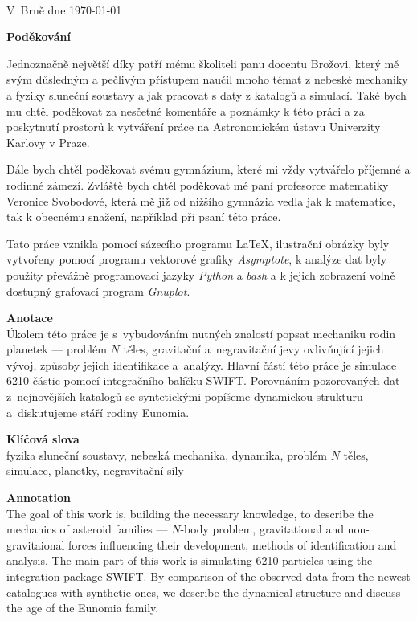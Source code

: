 \documentclass[A4paper, 12pt, oneside]{book}
\begin{document}
\

V~Brně dne \today\ \dotfill \hspace{10mm}

\newpage

{\large \bfseries Poděkování}

Jednoznačně největší díky patří mému školiteli panu docentu Brožovi, který mě svým důsledným a pečlivým přístupem naučil mnoho témat z nebeské mechaniky a fyziky sluneční soustavy a jak pracovat s daty z katalogů a simulací. Také bych mu chtěl poděkovat za nesčetné komentáře a poznámky k této práci a za poskytnutí prostorů k vytváření práce na Astronomickém ústavu Univerzity Karlovy v Praze.

Dále bych chtěl poděkovat svému gymnázium, které mi vždy vytvářelo příjemné a rodinné zámezí. Zvláště bych chtěl poděkovat mé paní profesorce matematiky Veronice Svobodové, která mě již od nižšího gymnázia vedla jak k matematice, tak k obecnému snažení, například při psaní této práce.

Tato práce vznikla pomocí sázecího programu \LaTeX, ilustrační obrázky byly vytvořeny pomocí programu vektorové grafiky \textit{Asymptote}, k analýze dat byly použity převážně programovací jazyky \textit{Python} a \textit{bash} a k jejich zobrazení volně dostupný grafovací program \textit{Gnuplot}.

\newpage

{\large \bfseries Anotace}\\
Úkolem této práce je s~vybudováním nutných znalostí popsat mechaniku rodin planetek --- problém $N$ těles, gravitační a~negravitační jevy ovlivňující jejich vývoj, způsoby jejich identifikace a~analýzy. Hlavní částí této práce je simulace 6210 částic pomocí integračního balíčku SWIFT. Porovnáním pozorovaných dat z~nejnovějších katalogů se syntetickými popíšeme dynamickou strukturu a~diskutujeme stáří rodiny Eunomia.

{\large \bfseries Klíčová slova}\\
fyzika sluneční soustavy, nebeská mechanika, dynamika, problém $N$ těles, simulace, planetky, negravitační síly

\vspace{24pt}

{\large \bfseries Annotation}\\
The goal of this work is, building the necessary knowledge, to describe the mechanics of asteroid families --- $N$-body problem, gravitational and non-gravitaional forces influencing their development, methods of identification and analysis. The main part of this work is simulating 6210 particles using the integration package SWIFT. By comparison of the observed data from the newest catalogues with synthetic ones, we describe the dynamical structure and discuss the age of the Eunomia family.
\end{document}
